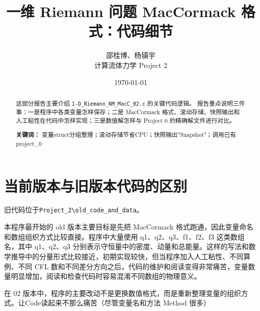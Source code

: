 \documentclass[UTF8,12pt,a4paper]{ctexart}
\title{一维 Riemann 问题 MacCormack 格式：代码细节}
\author{邵桂博、杨镇宇\\计算流体力学 Project 2}
\date{\today}
\begin{document}
\maketitle

\begin{abstract}
这部分报告主要介绍 \texttt{1-D\_Riemann\_NM\_MacC\_02.c} 的关键代码逻辑。
报告重点说明三件事：一是程序中各类变量怎样保存；二是 MacCormack
格式、滚动存储、快照输出和人工粘性在代码中怎样实现；三是数值解怎样与 Project 0 的精确解文件进行对比。

\textbf{关键词：} 变量struct分组整理；滚动存储节省CPU；快照输出"Snapshot"；调用已有project\_0
\end{abstract}

\tableofcontents
\newpage

\section{当前版本与旧版本代码的区别}
旧代码位于\texttt{Project\_2\textbackslash old\_code\_and\_data}。

本程序最开始的 old 版本主要目标是先把 MacCormack 格式跑通，因此变量命名和数组组织方式比较直接。程序中大量使用 q1、q2、q3、f1、f2、f3 这类数组名，其中 q1、q2、q3 分别表示守恒量中的密度、动量和总能量。这样的写法和数学推导中的分量形式比较接近，初期实现较快，但当程序加入人工粘性、不同算例、不同 CFL 数和不同差分方向之后，代码的维护和阅读变得非常痛苦，变量数量明显增加，阅读和检查代码时容易混淆不同数组的物理意义。

在 02 版本中，程序的主要改动不是更换数值格式，而是重新整理变量的组织方式。让Code读起来不那么痛苦（尽管变量名和方法 Method 很多）






\end{document}
